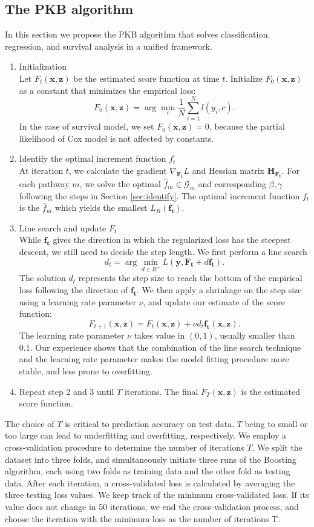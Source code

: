 \documentclass[a4paper,12pt]{article}
\newcommand{\bd}[1]{\mathbf{#1}}
\newcommand{\grad}[2]{\nabla_{\bd{#2}} #1}
\newcommand{\hess}[1]{\bd{H}_{\bd{#1}}}
\begin{document}
\subsection{The PKB algorithm}
In this section we propose the PKB algorithm that solves classification, regression, and survival analysis in a unified framework. 
\begin{enumerate}
	\item Initialization\\
	Let $F_t(\bd{x}, \bd{z})$ be the estimated score function at time $t$. Initialize $F_0(\bd{x}, \bd{z})$ as a constant that minimizes the empirical loss:
	$$F_0(\bd{x}, \bd{z}) = \arg\min_{c} \frac{1}{N} \sum_{i=1}^N l(y_i, c).$$
	In the case of survival model, we set $F_0(\bd{x}, \bd{z}) = 0$, because the partial likelihood of Cox model is not affected by constants.
	\item Identify the optimal increment function $f_t$\\
	At iteration $t$, we calculate the gradient $\grad{L}{F_t}$ and Hessian matrix $\hess{F_t}$. For each pathway $m$, we solve the optimal $\hat{f}_m \in \mathcal{G}_m$ and corresponding $\beta, \gamma$ following the steps in Section \ref{sec:identify}. The optimal increment function $f_t$ is the $\hat{f}_m$ which yields the smallest $L_R(\bd{f_t})$.
	\item Line search and update $F_t$\\
	While $\bd{f_t}$ gives the direction in which the regularized loss has the steepest descent, we still need to decide the step length. We first perform a line search
	$$ d_t = \arg\min_{d \in R^{+}} L(\bd{y}, \bd{F_t} + d\bd{f_t}).$$
	The solution $d_t$ represents the step size to reach the bottom of the empirical loss following the direction of $\bd{f_t}$. We then apply a shrinkage on the step size using a learning rate parameter $\nu$, and update our estimate of the score function:
	$$F_{t+1}(\bd{x}, \bd{z}) = F_t(\bd{x}, \bd{z}) + \nu d_t \bd{f_t}(\bd{x}, \bd{z}).$$
	The learning rate parameter $\nu$ takes value in $(0, 1)$, usually smaller than 0.1. Our experience shows that the combination of the line search technique and the learning rate parameter makes the model fitting procedure more stable, and less prone to overfitting.
	\item Repeat step 2 and 3 until $T$ iterations. The final $F_T(\bd{x}, \bd{z})$ is the estimated score function.
\end{enumerate}

The choice of $T$ is critical to prediction accuracy on test data. $T$ being to small or too large can lead to underfitting and overfitting, respectively. We employ a cross-validation procedure to determine the number of iterations $T$. We split the dataset into three folds, and simultaneously initiate three runs of the Boosting algorithm, each using two folds as training data and the other fold as testing data. After each iteration, a cross-validated loss is calculated by averaging the three testing loss values. We keep track of the minimum cross-validated loss. If its value does not change in 50 iterations, we end the cross-validation process, and choose the iteration with the minimum loss as the number of iterations T.
\end{document}
